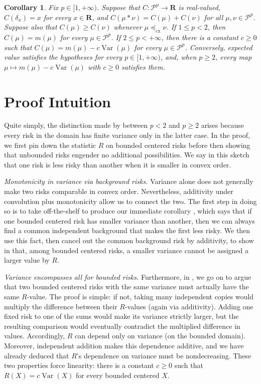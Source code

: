 \documentclass[11pt]{amsart}
\theoremstyle{plain}
\newtheorem{corollary}{Corollary}
\theoremstyle{definition}
\theoremstyle{remark}
\numberwithin{equation}{section}
\newcommand{\1}{\mathbf 1}
\begin{document}
\begin{corollary}\label{cor:certainty-equivalent}
Fix \(p\in[1,+\infty)\). Suppose that \(C\colon\mathcal P^p\to\mathbf R\) is real-valued, \(C(\delta_x)=x\) for every \(x\in\mathbf R\), and \(C(\mu*\nu)=C(\mu)+C(\nu)\) for all \(\mu,\nu\in\mathcal P^p\). Suppose also that \(C(\mu)\geq C(\nu)\) whenever \(\mu\preceq_{\mathrm{cx}}\nu\). If \(1\leq p<2\), then \(C(\mu)=m(\mu)\) for every \(\mu\in\mathcal P^p\). If \(2\leq p<+\infty\), then there is a constant \(c\geq0\) such that \(C(\mu)=m(\mu)-c\operatorname{Var}(\mu)\) for every \(\mu\in\mathcal P^p\). Conversely, expected value satisfies the hypotheses for every \(p\in[1,+\infty)\), and, when \(p\geq2\), every map \(\mu\mapsto m(\mu)-c\operatorname{Var}(\mu)\) with \(c\geq0\) satisfies them.
\end{corollary}

\section{Proof Intuition}

Quite simply, the distinction made by  between \(p<2\) and \(p\geq2\) arises because every risk in the domain has finite variance only in the latter case. In the proof, we first pin down the statistic \(R\) on bounded centered risks before then showing that unbounded risks engender no additional possibilities. We say in this sketch that one risk is less risky than another when it is smaller in convex order.

\emph{Monotonicity in variance via background risks.} Variance alone does not generally make two risks comparable in convex order. Nevertheless, additivity under convolution plus monotonicity allow us to connect the two. The first step in doing so is to take \citet[Theorem 2]{pomattoStrackTamuz2020} off-the-shelf to produce our immediate corollary  , which says that if one bounded centered risk has smaller variance than another, then we can always find a common independent background that makes the first less risky. We then use this fact, then cancel out the common background risk by additivity, to show in  that, among bounded centered risks, a smaller variance cannot be assigned a larger value by \(R\).

\emph{Variance encompasses all for bounded risks.} Furthermore, in , we go on to argue that two bounded centered risks with the same variance must actually have the same \(R\)-value. The proof is simple: if not, taking many independent copies would multiply the difference between their \(R\)-values (again via additivity). Adding one fixed risk to one of the sums would make its variance strictly larger, but the resulting comparison would eventually contradict the multiplied difference in values. Accordingly, \(R\) can depend only on variance (on the bounded domain). Moreover, independent addition makes this dependence additive, and we have already deduced that \(R\)'s dependence on variance must be nondecreasing. These two properties force linearity: there is a constant \(c\geq0\) such that \(R(X)=c\operatorname{Var}(X)\) for every bounded centered \(X\).
\end{document}
